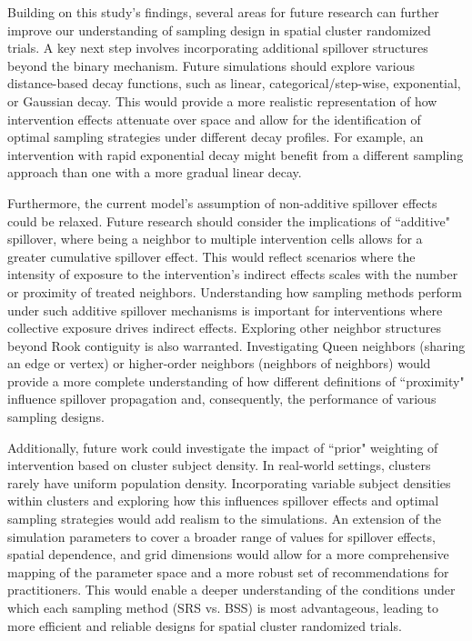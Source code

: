 \documentclass{article}[11pt]
\begin{document}
Building on this study's findings, several areas for future research can further improve our
understanding of sampling design in spatial cluster randomized trials. A key next step involves incorporating additional spillover structures beyond the binary mechanism. Future simulations should explore various distance-based decay functions, such
as linear, categorical/step-wise, exponential, or Gaussian decay. This would provide a more
realistic representation of how intervention effects attenuate over space and allow for the
identification of optimal sampling strategies under different decay profiles. For example, an
intervention with rapid exponential decay might benefit from a different sampling approach
than one with a more gradual linear decay.

Furthermore, the current model's assumption of non-additive spillover effects could be
relaxed. Future research should consider the implications of ``additive" spillover, where
being a neighbor to multiple intervention cells allows for a greater cumulative spillover effect.
This would reflect scenarios where the intensity of exposure to the intervention's indirect
effects scales with the number or proximity of treated neighbors. Understanding how
sampling methods perform under such additive spillover mechanisms is important for
interventions where collective exposure drives indirect effects. Exploring other neighbor structures beyond Rook contiguity is also warranted. Investigating Queen neighbors (sharing an edge or vertex) or higher-order neighbors (neighbors of
neighbors) would provide a more complete understanding of how different definitions of
``proximity" influence spillover propagation and, consequently, the performance of various
sampling designs.

Additionally, future work could investigate the impact of ``prior" weighting of intervention
based on cluster subject density. In real-world settings, clusters rarely have uniform
population density. Incorporating variable subject densities within clusters and exploring how
this influences spillover effects and optimal sampling strategies would add realism to the
simulations. An extension of the simulation parameters to cover a broader range of values for spillover
effects, spatial dependence, and grid dimensions would allow for a more comprehensive mapping of the
parameter space and a more robust set of recommendations for practitioners. This would
enable a deeper understanding of the conditions under which each sampling method (SRS vs.
BSS) is most advantageous, leading to more efficient and reliable designs for spatial cluster
randomized trials.
\end{document}
